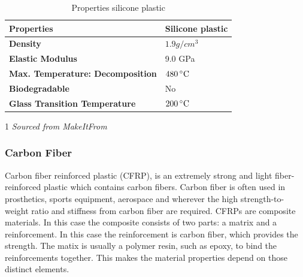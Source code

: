 \documentclass[11pt, a4paper]{article}
\begin{document}
\begin{table}[ht]
    \centering
    \begin{threeparttable}
        \begin{tabular}[t]{>{\bfseries}l l}
            \toprule
            Properties\tnote{1} & \textbf{Silicone plastic}  \\
            \midrule
            Density & $1.9 g/cm^3$  \\
            Elastic Modulus & 9.0 GPa \\ %
            Max. Temperature: Decomposition & $480\,^{\circ}{\rm C}$  \\
            Biodegradable & No  \\
            Glass Transition Temperature & $200\,^{\circ}{\rm C}$  \\ %
            \bottomrule
        \end{tabular}
        \caption{Properties silicone plastic}
        \label{tab:silicone-properties}
        \begin{tablenotes}
            \item[1] \textit{Sourced from MakeItFrom \cite{MakeItFrom}}
        \end{tablenotes}    
    \end{threeparttable}    
\end{table}

\subsubsection{Carbon Fiber}
Carbon fiber reinforced plastic (CFRP), is an extremely strong and light fiber-reinforced plastic which contains carbon fibers.
Carbon fiber is often used in prosthetics, sports equipment, aerospace and wherever the high strength-to-weight ratio and stiffness from carbon fiber are required.
CFRPs are composite materials.
In this case the composite consists of two parts: a matrix and a reinforcement.
In this case the reinforcement is carbon fiber, which provides the strength.
The matix is usually a polymer resin, such as epoxy, to bind the reinforcements together.
This makes the material properties depend on those distinct elements.
\end{document}
